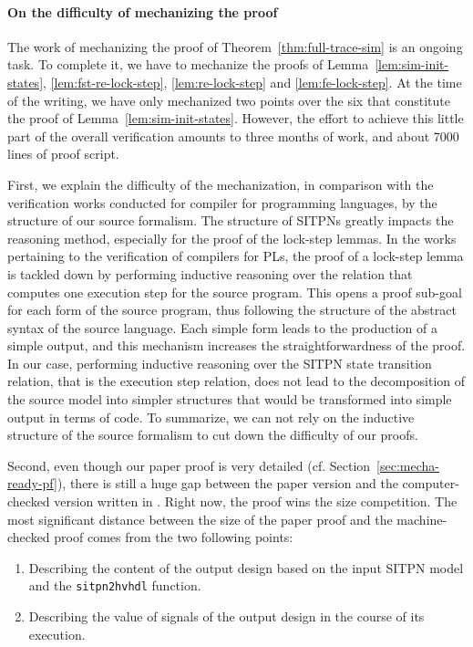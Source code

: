 \documentclass[pdflatex,sn-mathphys]{sn-jnl}%
\theoremstyle{thmstyleone}%
\theoremstyle{thmstyletwo}%
\theoremstyle{thmstylethree}%
\begin{document}
\paragraph{On the difficulty of mechanizing the proof}

The work of mechanizing the proof of Theorem~\ref{thm:full-trace-sim}
is an ongoing task. To complete it, we have to mechanize the proofs of
Lemma~\ref{lem:sim-init-states}, \ref{lem:fst-re-lock-step},
\ref{lem:re-lock-step} and \ref{lem:fe-lock-step}. At the time of the
writing, we have only mechanized two points over the six that
constitute the proof of Lemma~\ref{lem:sim-init-states}. However, the
effort to achieve this little part of the overall verification amounts
to three months of work, and about 7000 lines of proof script.

\bigskip

First, we explain the difficulty of the mechanization, in comparison
with the verification works conducted for compiler for programming
languages, by the structure of our source
formalism.  %
The structure of SITPNs greatly impacts the reasoning method,
especially for the proof of the lock-step lemmas. In the works
pertaining to the verification of compilers for PLs, the proof of a
lock-step lemma is tackled down by performing inductive reasoning over
the relation that computes one execution step for the source
program. This opens a proof sub-goal for each form of the source
program, thus following the structure of the abstract syntax of the
source language. Each simple form leads to the production of a simple
output, and this mechanism increases the straightforwardness of the
proof. In our case, performing inductive reasoning over the SITPN
state transition relation, that is the execution step relation, does
not lead to the decomposition of the source model into simpler
structures that would be transformed into simple output in terms of
\vhdl{} code. To summarize, we can not rely on the inductive structure
of the source formalism to cut down the difficulty of our proofs.

\bigskip

Second, even though our paper proof is very detailed
(cf. Section~\ref{sec:mecha-ready-pf}), there is still a huge gap
between the paper version and the computer-checked version written in
\coq{}.  Right now, the \coq{} proof wins the size competition. The
most significant distance between the size of the paper proof and the
machine-checked proof comes from the two following points:
\begin{enumerate}
  
\item Describing the content of the output design based on the
  input SITPN model and the \texttt{sitpn2hvhdl} function.
\item Describing the value of signals of the output design in the
  course of its execution.
\end{enumerate}
\end{document}
